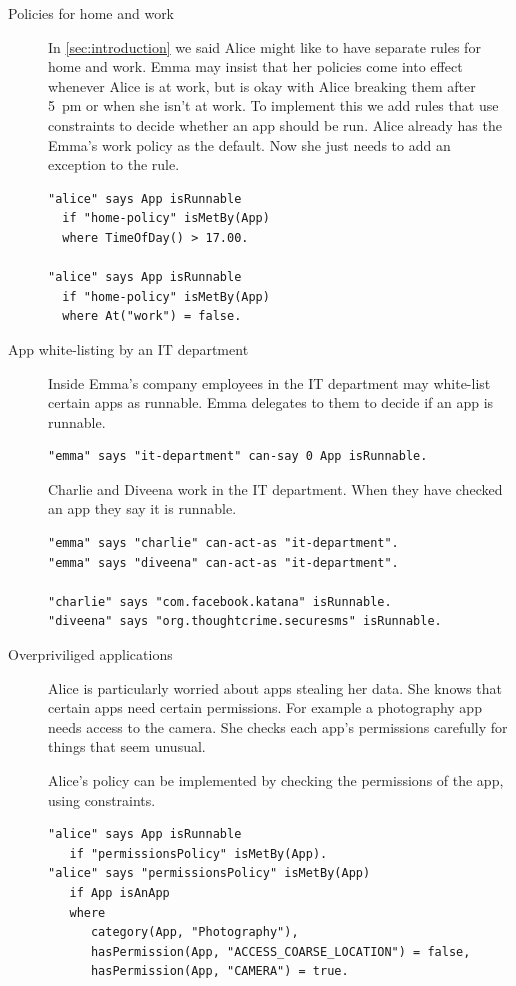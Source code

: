 \documentclass[]{scrartcl}
\begin{document}
\begin{description}
  \item[Policies for home and work]
    In \autoref{sec:introduction} we said Alice might like to have separate rules for home and work.
    Emma may insist that her policies come into effect whenever Alice is at work, but is okay with Alice breaking them after 5~pm or when she isn't at work.
    To implement this we add rules that use constraints to decide whether an app should be run.
    Alice already has the Emma's work policy as the default.
    Now she just needs to add an exception to the rule.
    \begin{lstlisting}
"alice" says App isRunnable
  if "home-policy" isMetBy(App)
  where TimeOfDay() > 17.00.

"alice" says App isRunnable
  if "home-policy" isMetBy(App)
  where At("work") = false.
    \end{lstlisting}

  \item[App white-listing by an IT department]
    Inside Emma's company employees in the IT department may white-list certain apps as runnable.
    Emma delegates to them to decide if an app is runnable.
    \begin{lstlisting}
"emma" says "it-department" can-say 0 App isRunnable.
    \end{lstlisting}
    Charlie and Diveena work in the IT department.
    When they have checked an app they say it is runnable.
    \begin{lstlisting}
"emma" says "charlie" can-act-as "it-department".
"emma" says "diveena" can-act-as "it-department".

"charlie" says "com.facebook.katana" isRunnable.
"diveena" says "org.thoughtcrime.securesms" isRunnable.
    \end{lstlisting}

  \item[Overpriviliged applications]
    Alice is particularly worried about apps stealing her data.
    She knows that certain apps need certain permissions.
    For example a photography app needs access to the camera.
    She checks each app's permissions carefully for things that seem unusual.

    Alice's policy can be implemented by checking the permissions of the app, using constraints.
    \begin{lstlisting}
"alice" says App isRunnable
   if "permissionsPolicy" isMetBy(App).
"alice" says "permissionsPolicy" isMetBy(App)
   if App isAnApp
   where
      category(App, "Photography"),
      hasPermission(App, "ACCESS_COARSE_LOCATION") = false,
      hasPermission(App, "CAMERA") = true.
    \end{lstlisting}


\end{description}
\end{document}
